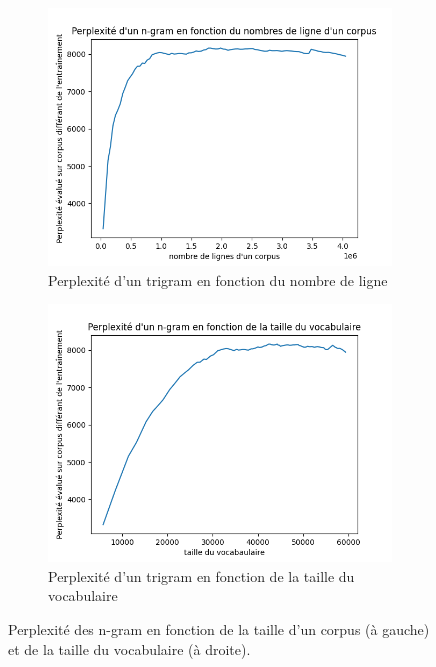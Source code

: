 \documentclass[a4paper]{article}
\begin{document}
\begin{figure}[!ht]
      \begin{subfigure}{0.47\textwidth}
        \includegraphics[width=\linewidth]{../results/balzac_result/balzac_3_lines.png}
        \caption{Perplexité d'un trigram en fonction du nombre de ligne}
      \end{subfigure}
      \hfill
      \begin{subfigure}{0.47\textwidth}
        \includegraphics[width=\linewidth]{../results/balzac_result/balzac_3_vocab_size.png}
        \caption{Perplexité d'un trigram en fonction de la taille du vocabulaire}
      \end{subfigure}
      \caption{Perplexité des n-gram en fonction de la taille d'un corpus (à gauche) et de la taille du vocabulaire (à droite).}
      \label{fig: balzac results}
\end{figure}
\end{document}
